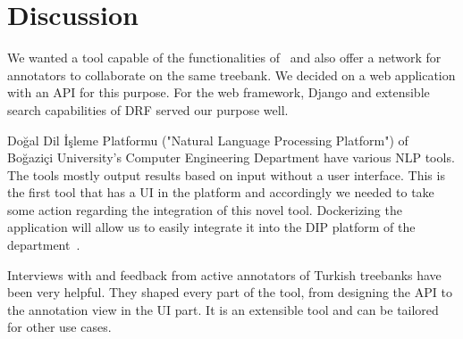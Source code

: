 \section{Discussion}
\label{sec:discussion}

We wanted a tool capable of the functionalities of \boatvone\ and also offer a network for annotators to collaborate on the same treebank.
We decided on a web application with an API for this purpose.
For the web framework, Django and extensible search capabilities of DRF served our purpose well.

Doğal Dil İşleme Platformu ("Natural Language Processing Platform") of Boğaziçi University's Computer Engineering Department have various NLP tools.
The tools mostly output results based on input without a user interface.
This is the first tool that has a UI in the platform and accordingly we needed to take some action regarding the integration of this novel tool.
Dockerizing the application will allow us to easily integrate it into the DIP platform of the department~\cite{DIP}.

Interviews with and feedback from active annotators of Turkish treebanks have been very helpful.
They shaped every part of the tool, from designing the API to the annotation view in the UI part.
It is an extensible tool and can be tailored for other use cases.
